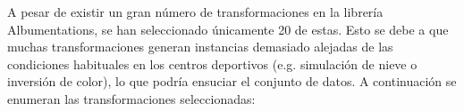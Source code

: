 \documentclass[12pt]{report} %
\begin{document}

    A pesar de existir un gran número de transformaciones en la librería
    Albumentations, se han seleccionado únicamente 20 de estas. Esto se debe a
    que muchas transformaciones generan instancias demasiado alejadas de las
    condiciones habituales en los centros deportivos (e.g. simulación de nieve
    o inversión de color), lo que podría ensuciar el conjunto de datos. A
    continuación se enumeran las transformaciones seleccionadas:
\end{document}

